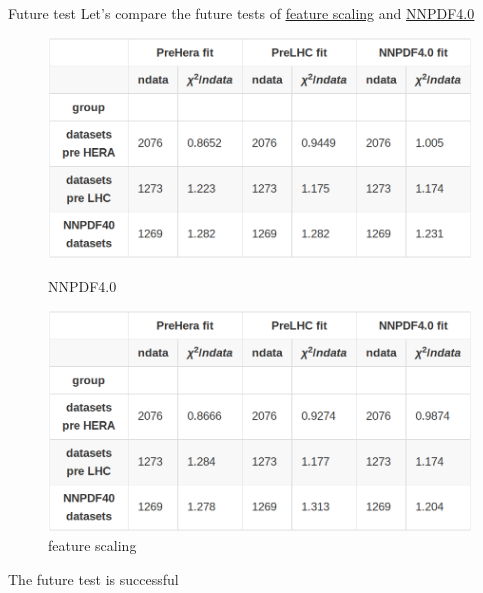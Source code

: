 \documentclass[aspectratio=169,11pt]{beamer}
\begin{document}
\begin{frame}[t]{Future test}
  Let's compare the future tests of {\color{blue} \underline{ \href{https://vp.nnpdf.science/TVyAUeiNTk26IMYAfRNqLw==}{feature scaling}}} and {\color{blue} \underline{\href{https://vp.nnpdf.science/ArCroD6xRxmTAGHSBJoD3Q==/}{NNPDF4.0}}}
  \begin{center}
    \begin{figure}
        \includegraphics[width=1\textwidth]{figures/futuretest_nnpdf40.png}
        \captionsetup{labelformat=empty}
        \caption{NNPDF4.0}
      \endminipage\hfill
        \includegraphics[width=1\textwidth]{figures/futuretest_feature.png}
        \captionsetup{labelformat=empty}
        \caption{feature scaling}
      \endminipage
    \end{figure}
    \vspace*{1em}
     {The future test is successful}
  \end{center}
\end{frame}
\end{document}

